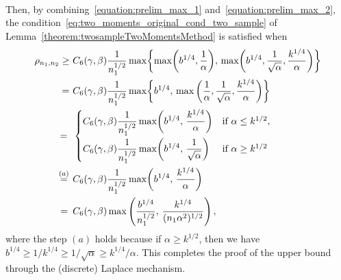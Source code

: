 \documentclass[twoside,11pt]{article}
\newcommand{\alphabetSize}{k} %
\newcommand{\sampleSize}{n}
\newcommand{\privacyParameter}{\alpha} %
\begin{document}
\begin{appendix}
\begin{itemize}
\begin{align*}
	\end{align*}
	Then, by combining~\eqref{equation:prelim_max_1} and~\eqref{equation:prelim_max_2}, the condition~\eqref{eq:two_moments_original_cond_two_sample} of Lemma~\ref{theorem:twosampleTwoMomentsMethod} is satisfied when
	\begin{align*}
		\rho_{\sampleSize_1,\sampleSize_2}
		\geq ~&
		C_6(\gamma, \beta)
		\frac{1}{\sampleSize_1^{1/2}}
		\max
		\biggl\{
		\max
		\biggl(
		{b}^{1/4}, \frac{1}{\privacyParameter}
		\biggr), \,
		\max
		\biggl(
		{b}^{1/4},
		\frac{1}{\sqrt{\privacyParameter}},
		\frac{\alphabetSize^{1/4}}{\privacyParameter}
		\biggr)
		\biggr\}
		\\= ~ &
		C_6(\gamma, \beta) 
		\frac{1}{\sampleSize_1^{1/2}}
		\max
		\biggl\{
		{b}^{1/4}, \,
		\max
		\bigg(
		\frac{1}{\privacyParameter},
		\frac{1}{\sqrt{\privacyParameter}},
		\frac{\alphabetSize^{1/4}}{\privacyParameter}
		\biggr)
		\biggr\}
		\\= \hskip 1.91mm &
		\begin{cases}
			\displaystyle C_6(\gamma, \beta) 
			\frac{1}{\sampleSize_1^{1/2}}
			\max
			\biggl(
			{b}^{1/4}, \,
			\frac{\alphabetSize^{1/4}}{\privacyParameter}
			\biggr) & \text{if}~\alpha \leq \alphabetSize^{1/2},
			\\[1em]
			\displaystyle C_6(\gamma, \beta)
			\frac{1}{\sampleSize_1^{1/2}}
			\max
			\biggl(
			{b}^{1/4}, \,
			\frac{1}{\sqrt{\privacyParameter}}
			\biggr) & \text{if}~\alpha \geq \alphabetSize^{1/2}
		\end{cases}
		\\ \stackrel{(a)}{=} \hskip 1.37mm &
		C_6(\gamma, \beta) 
		\frac{1}{\sampleSize_1^{1/2}}
		\max
		\biggl(
		{b}^{1/4}, \,
		\frac{\alphabetSize^{1/4}}{\privacyParameter}
		\biggr)
		\\ = \hskip 1.74mm  &
		C_6(\gamma, \beta) 
		\max\left(
		\frac
		{{b}^{1/4}}
		{\sampleSize_1^{1/2}}, \,
		\frac
		{\alphabetSize^{1/4}}
		{(\sampleSize_1 \privacyParameter^2)^{1/2}}
		\right),
	\end{align*}
	where the step $(a)$ holds because if $\alpha \geq \alphabetSize^{1/2}$, then we have
	$
	{b}^{1/4}
	\geq
	1 / \alphabetSize^{1/4}
	\geq 
	1 / \sqrt{\privacyParameter}
	\geq
	\alphabetSize^{1/4} / \privacyParameter.
	$
	This completes the proof of the upper bound through the (discrete) Laplace  mechanism.
	\end{itemize}

\end{appendix}
\end{document}
